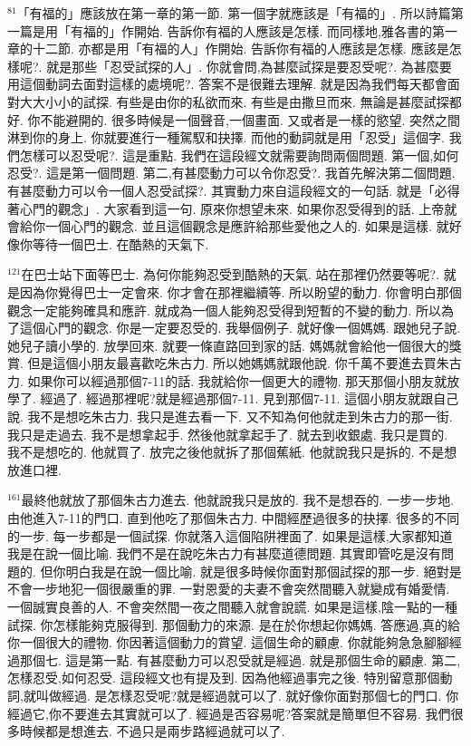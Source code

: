 \documentclass{book}
\begin{document}
$^{81}$「有福的」應該放在第一章的第一節.
第一個字就應該是「有福的」.
所以詩篇第一篇是用「有福的」作開始.
告訴你有福的人應該是怎樣.
而同樣地,雅各書的第一章的十二節.
亦都是用「有福的人」作開始.
告訴你有福的人應該是怎樣.
應該是怎樣呢?.
就是那些「忍受試探的人」.
你就會問,為甚麼試探是要忍受呢?.
為甚麼要用這個動詞去面對這樣的處境呢?.
答案不是很難去理解.
就是因為我們每天都會面對大大小小的試探.
有些是由你的私欲而來.
有些是由撒旦而來.
無論是甚麼試探都好.
你不能避開的.
很多時候是一個聲音,一個畫面.
又或者是一樣的慾望.
突然之間淋到你的身上.
你就要進行一種駕馭和抉擇.
而他的動詞就是用「忍受」這個字.
我們怎樣可以忍受呢?.
這是重點.
我們在這段經文就需要詢問兩個問題.
第一個,如何忍受?.
這是第一個問題.
第二,有甚麼動力可以令你忍受?.
我首先解決第二個問題.
有甚麼動力可以令一個人忍受試探?.
其實動力來自這段經文的一句話.
就是「必得著心門的觀念」.
大家看到這一句.
原來你想望未來.
如果你忍受得到的話.
上帝就會給你一個心門的觀念.
並且這個觀念是應許給那些愛他之人的.
如果是這樣.
就好像你等待一個巴士.
在酷熱的天氣下.

$^{121}$在巴士站下面等巴士.
為何你能夠忍受到酷熱的天氣.
站在那裡仍然要等呢?.
就是因為你覺得巴士一定會來.
你才會在那裡繼續等.
所以盼望的動力.
你會明白那個觀念一定能夠確具和應許.
就成為一個人能夠忍受得到短暫的不變的動力.
所以為了這個心門的觀念.
你是一定要忍受的.
我舉個例子.
就好像一個媽媽.
跟她兒子說.
她兒子讀小學的.
放學回來.
就要一條直路回到家的話.
媽媽就會給他一個很大的獎賞.
但是這個小朋友最喜歡吃朱古力.
所以她媽媽就跟他說.
你千萬不要進去買朱古力.
如果你可以經過那個7-11的話.
我就給你一個更大的禮物.
那天那個小朋友就放學了.
經過了.
經過那裡呢?就是經過那個7-11.
見到那個7-11.
這個小朋友就跟自己說.
我不是想吃朱古力.
我只是進去看一下.
又不知為何他就走到朱古力的那一街.
我只是走過去.
我不是想拿起手.
然後他就拿起手了.
就去到收銀處.
我只是買的.
我不是想吃的.
他就買了.
放完之後他就拆了那個蕉紙.
他就說我只是拆的.
不是想放進口裡.

$^{161}$最終他就放了那個朱古力進去.
他就說我只是放的.
我不是想吞的.
一步一步地.
由他進入7-11的門口.
直到他吃了那個朱古力.
中間經歷過很多的抉擇.
很多的不同的一步.
每一步都是一個試探.
你就落入這個陷阱裡面了.
如果是這樣,大家都知道我是在說一個比喻.
我們不是在說吃朱古力有甚麼道德問題.
其實即管吃是沒有問題的.
但你明白我是在說一個比喻.
就是很多時候你面對那個試探的那一步.
絕對是不會一步地犯一個很嚴重的罪.
一對恩愛的夫妻不會突然間聽入就變成有婚愛情.
一個誠實良善的人.
不會突然間一夜之間聽入就會說謊.
如果是這樣,陰一點的一種試探.
你怎樣能夠克服得到.
那個動力的來源.
是在於你想起你媽媽.
答應過,真的給你一個很大的禮物.
你因著這個動力的賞望.
這個生命的顧慮.
你就能夠急急腳腳經過那個七.
這是第一點.
有甚麼動力可以忍受就是經過.
就是那個生命的顧慮.
第二,怎樣忍受,如何忍受.
這段經文也有提及到.
因為他經過事完之後.
特別留意那個動詞,就叫做經過.
是怎樣忍受呢?就是經過就可以了.
就好像你面對那個七的門口.
你經過它,你不要進去其實就可以了.
經過是否容易呢?答案就是簡單但不容易.
我們很多時候都是想進去.
不過只是兩步路經過就可以了.
\end{document}
